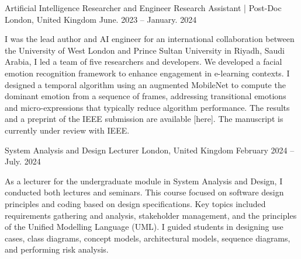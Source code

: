 

\begin{cventries}



  \cventry
    {Artificial Intelligence Researcher and Engineer} %
    {Research Assistant | Post-Doc} %
    {London, United Kingdom} %
    {June. 2023 -- January. 2024} %
    {
      \begin{cvitems} %
        \item {I was the lead author and AI engineer for an international collaboration between the University of West London and Prince Sultan University in Riyadh, Saudi Arabia, I led a team of five researchers and developers. We developed a facial emotion recognition framework to enhance engagement in e-learning contexts. I designed a temporal algorithm using an augmented MobileNet to compute the dominant emotion from a sequence of frames, addressing transitional emotions and micro-expressions that typically reduce algorithm performance. The results and a preprint of the IEEE submission are available [here]. The manuscript is currently under review with IEEE.}
      \end{cvitems}
    }

 \cventry
    {System Analysis and Design} %
    {Lecturer} %
    {London, United Kingdom} %
    {February 2024 -- July. 2024} %
    {
      \begin{cvitems} %
        \item {As a lecturer for the undergraduate module in System Analysis and Design, I conducted both lectures and seminars. This course focused on software design principles and coding based on design specifications. Key topics included requirements gathering and analysis, stakeholder management, and the principles of the Unified Modelling Language (UML). I guided students in designing use cases, class diagrams, concept models, architectural models, sequence diagrams, and performing risk analysis.}
      \end{cvitems}
    }



\end{cventries}
